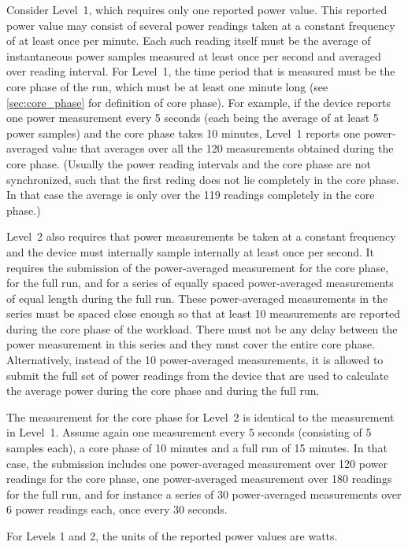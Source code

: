 \noindent
Consider Level~1, which requires only one reported power value.
This reported power value may consist of several power readings taken at a constant frequency of at least once per minute.
Each such reading itself must be the average of instantaneous power samples measured at least once per second and averaged over reading interval.
For Level~1, the time period that is measured must be the core phase of the run, which must be at least one minute long (see \ref{sec:core_phase} for definition of core phase).
For example, if the device reports one power measurement every 5 seconds (each being the average of at least 5 power samples) and the core phase takes 10 minutes, Level~1 reports one power-averaged value that averages over all the 120 measurements obtained during the core phase.
(Usually the power reading intervals and the core phase are not synchronized, such that the first reding does not lie completely in the core phase.
In that case the average is only over the 119 readings completely in the core phase.)
\wl

\noindent
Level~2 also requires that power measurements be taken at a constant frequency and the device must internally sample internally at least once per second.
It requires the submission of the power-averaged measurement for the core phase, for the full run, and for a series of equally spaced power-averaged measurements of equal length during the full run.
These power-averaged measurements in the series must be spaced close enough so that at least 10 measurements are reported during the core phase of the workload.
There must not be any delay between the power measurement in this series and they must cover the entire core phase.
Alternatively, instead of the 10 power-averaged measurements, it is allowed to submit the full set of power readings from the device that are used to calculate the average power during the core phase and during the full run.
\wl

\noindent
The measurement for the core phase for Level~2 is identical to the measurement in Level~1.
Assume again one measurement every 5 seconds (consisting of 5 samples each), a core phase of 10 minutes and a full run of 15 minutes.
In that case, the submission includes one power-averaged measurement over 120 power readings for the core phase, one power-averaged measurement over 180 readings for the full run, and for instance a series of 30 power-averaged measurements over 6 power readings each, once every 30 seconds.
\wl

\noindent
For Levels 1 and 2, the units of the reported power values are watts.
\wl

